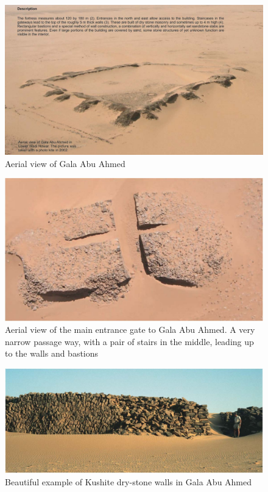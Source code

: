 \documentclass[a4paper,12pt]{scrreprt}
\begin{document}
\begin{figure}[H]
	\centering
	\includegraphics[width=\textwidth]{img/fortress/aerial_view_gala_abu_ahmed}
	\caption{Aerial view of Gala Abu Ahmed}
\end{figure}

\begin{figure}[H]
	\centering
	\includegraphics[width=\textwidth]{img/fortress/aerial_view_entrance_bastion}
	\caption{Aerial view of the main entrance gate to Gala Abu Ahmed. A very narrow passage way, with a pair of stairs in the middle, leading up to the walls and bastions}
\end{figure}

\begin{figure}[H]
	\centering
	\includegraphics[width=\textwidth]{img/fortress/dry_stone_wall_gala_abu_ahmed}
	\caption{Beautiful example of Kushite dry-stone walls in Gala Abu Ahmed}
\end{figure}
\end{document}
